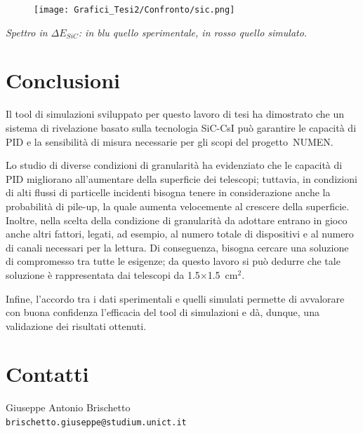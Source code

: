 \documentclass[10pt,foldmark]{leaflet}
\begin{document}
\begin{figure} [!h]
	\centering
	\texttt{[image: Grafici\_Tesi2/Confronto/sic.png]}
\end{figure}
\textit{Spettro in $\Delta E_{SiC}$: in blu quello sperimentale, in rosso quello simulato.}


\section{Conclusioni}


Il tool di simulazioni sviluppato per questo lavoro di tesi ha dimostrato che un sistema di rivelazione basato sulla tecnologia SiC-CsI può garantire le capacità di PID e la sensibilità di misura necessarie per gli scopi del progetto~NUMEN.

Lo studio di diverse condizioni di granularità ha evidenziato che le capacità di PID migliorano all'aumentare della superficie dei telescopi; tuttavia, in condizioni di alti flussi di particelle incidenti bisogna tenere in considerazione anche la probabilità di pile-up, la quale aumenta velocemente al crescere della superficie.
Inoltre, nella scelta della condizione di granularità da adottare entrano in gioco anche altri fattori, legati, ad esempio, al numero totale di dispositivi e al numero di canali necessari per la lettura.
Di conseguenza, bisogna cercare una soluzione di compromesso tra tutte le esigenze; da questo lavoro si può dedurre che tale soluzione è rappresentata dai telescopi da 1.5$\times$1.5~$\mbox{cm}^2$.

Infine, l'accordo tra i dati sperimentali e quelli simulati permette di avvalorare con buona confidenza l'efficacia del tool di simulazioni e dà, dunque, una validazione dei risultati ottenuti.













\section{Contatti}

Giuseppe Antonio Brischetto\\ {\tt brischetto.giuseppe@studium.unict.it}
\end{document}
